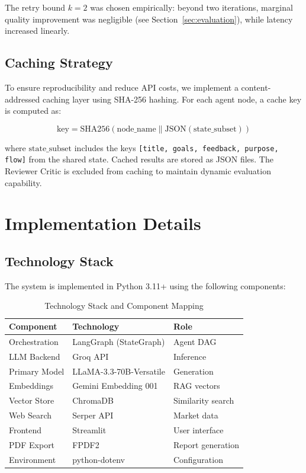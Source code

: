 \documentclass[journal]{IEEEtran}
\begin{document}
The retry bound $k=2$ was chosen empirically: beyond two iterations, marginal quality improvement was negligible (see Section~\ref{sec:evaluation}), while latency increased linearly.

\subsection{Caching Strategy}

To ensure reproducibility and reduce API costs, we implement a content-addressed caching layer using SHA-256 hashing. For each agent node, a cache key is computed as:

\begin{equation}
    \text{key} = \text{SHA256}(\text{node\_name} \| \text{JSON}(\text{state\_subset}))
    \label{eq:cache}
\end{equation}

where $\text{state\_subset}$ includes the keys \texttt{[title, goals, feedback, purpose, flow]} from the shared state. Cached results are stored as JSON files. The Reviewer Critic is excluded from caching to maintain dynamic evaluation capability.

\section{Implementation Details}
\label{sec:implementation}

\subsection{Technology Stack}

The system is implemented in Python 3.11+ using the following components:

\begin{table}[!t]
    \centering
    \caption{Technology Stack and Component Mapping}
    \label{tab:techstack}
    \begin{tabular}{@{}lll@{}}
        \toprule
        \textbf{Component} & \textbf{Technology} & \textbf{Role} \\
        \midrule
        Orchestration & LangGraph (StateGraph) & Agent DAG \\
        LLM Backend & Groq API & Inference \\
        Primary Model & LLaMA-3.3-70B-Versatile & Generation \\
        Embeddings & Gemini Embedding 001 & RAG vectors \\
        Vector Store & ChromaDB & Similarity search \\
        Web Search & Serper API & Market data \\
        Frontend & Streamlit & User interface \\
        PDF Export & FPDF2 & Report generation \\
        Environment & python-dotenv & Configuration \\
        \bottomrule
    \end{tabular}
\end{table}
\end{document}

